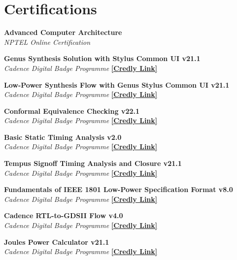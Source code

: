 \section{\sc Certifications}

{\bf{Advanced Computer Architecture }} \\
\textit{NPTEL Online Certification} 

{\bf{Genus Synthesis Solution with Stylus Common UI v21.1}} \\
\textit{Cadence Digital Badge Programme} 
\href{https://www.credly.com/badges/fc9243f2-ca59-4cf6-b2a0-4f01a284d005}{{\bf[Credly Link]}}

{\bf{Low-Power Synthesis Flow with Genus Stylus Common UI v21.1}} \\
\textit{Cadence Digital Badge Programme} 
\href{https://www.credly.com/badges/574c0d1c-5e5f-4b63-bbec-34bf15f34715}{{\bf[Credly Link]}}

{\bf{Conformal Equivalence Checking v22.1}} \\
\textit{Cadence Digital Badge Programme} 
\href{https://www.credly.com/badges/5662fd4d-f91e-4f24-9ff9-030c9c8a806e}{{\bf[Credly Link]}}

{\bf{Basic Static Timing Analysis v2.0}} \\
\textit{Cadence Digital Badge Programme} 
\href{https://www.credly.com/badges/a86a351b-9722-4ee5-8fe0-0ac785ead4e7}{{\bf[Credly Link]}}

{\bf{Tempus Signoff Timing Analysis and Closure v21.1}} \\
\textit{Cadence Digital Badge Programme} 
\href{https://www.credly.com/badges/233a9c95-dda6-4e62-af14-dd33d5e06c6d}{{\bf[Credly Link]}}

{\bf{Fundamentals of IEEE 1801 Low-Power Specification Format v8.0}} \\
\textit{Cadence Digital Badge Programme} 
\href{https://www.credly.com/badges/76d37ce1-0283-4ce9-b084-7f8a1c5ceb2e}{{\bf[Credly Link]}}

{\bf{Cadence RTL-to-GDSII Flow v4.0}} \\
\textit{Cadence Digital Badge Programme} 
\href{https://www.credly.com/badges/fca2b565-9ed0-4791-a0b7-0f0ff65f79da}{{\bf[Credly Link]}}

{\bf{Joules Power Calculator v21.1}} \\
\textit{Cadence Digital Badge Programme} 
\href{https://www.credly.com/badges/93a74be8-6d4e-495e-9af2-48a953915f6a}{{\bf[Credly Link]}}

\endinput
